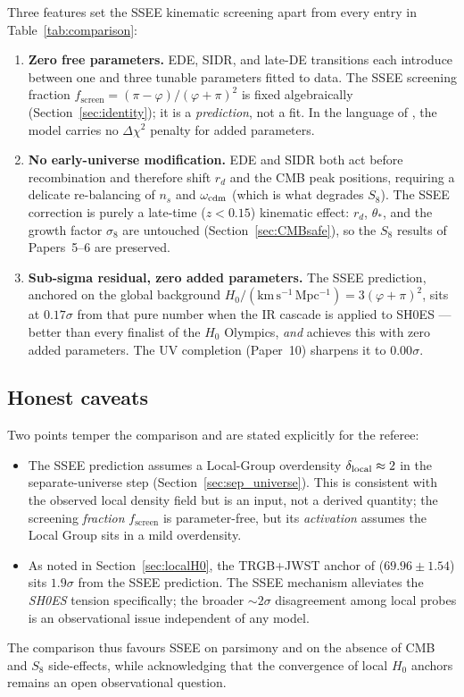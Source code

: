 \documentclass[12pt,a4paper]{article}
\newcommand{\phiG}{\varphi}
\newcommand{\fsc}{f_{\mathrm{screen}}}
\begin{document}
Three features set the SSEE kinematic screening apart from every entry in
Table~\ref{tab:comparison}:
\begin{enumerate}[label=(\roman*),itemsep=2pt]
  \item \textbf{Zero free parameters.}  EDE, SIDR, and late-DE transitions each
        introduce between one and three tunable parameters fitted to data.
        The SSEE screening fraction $\fsc = (\pi-\phiG)/(\phiG+\pi)^2$ is fixed
        algebraically (Section~\ref{sec:identity}); it is a \emph{prediction},
        not a fit.  In the language of \citet{Schoneberg2022}, the model carries
        no $\Delta\chi^2$ penalty for added parameters.
  \item \textbf{No early-universe modification.}  EDE and SIDR both act before
        recombination and therefore shift $r_d$ and the CMB peak positions,
        requiring a delicate re-balancing of $n_s$ and $\omega_{\rm cdm}$
        (which is what degrades $S_8$).  The SSEE correction is purely a
        late-time ($z<0.15$) kinematic effect: $r_d$, $\theta_*$, and the
        growth factor $\sigma_8$ are untouched (Section~\ref{sec:CMBsafe}),
        so the $S_8$ results of Papers~5--6 are preserved.
  \item \textbf{Sub-sigma residual, zero added parameters.}  The
        SSEE prediction, anchored on the global background
        $H_0/(\mathrm{km\,s^{-1}\,Mpc^{-1}})=3(\phiG+\pi)^2$, sits at $0.17\sigma$
        from that pure number when the IR cascade is applied to SH0ES --- better than every finalist of the
        $H_0$ Olympics, \emph{and} achieves this with zero added parameters.
        The UV completion (Paper~10) sharpens it to $0.00\sigma$.
\end{enumerate}

\subsection{Honest caveats}
\label{sec:comp_caveats}

Two points temper the comparison and are stated explicitly for the referee:
\begin{itemize}[itemsep=2pt]
  \item The SSEE prediction assumes a Local-Group overdensity
        $\delta_{\rm local}\approx 2$ in the separate-universe step
        (Section~\ref{sec:sep_universe}).  This is consistent with the observed
        local density field but is an input, not a derived quantity; the
        screening \emph{fraction} $\fsc$ is parameter-free, but its
        \emph{activation} assumes the Local Group sits in a mild overdensity.
  \item As noted in Section~\ref{sec:localH0}, the TRGB+JWST anchor of
        \citet{Freedman2024} ($69.96\pm1.54$) sits $1.9\sigma$ from the SSEE
        prediction.  The SSEE mechanism alleviates the \emph{SH0ES} tension
        specifically; the broader $\sim 2\sigma$ disagreement among local
        probes is an observational issue independent of any model.
\end{itemize}
The comparison thus favours SSEE on parsimony and on the absence of CMB and
$S_8$ side-effects, while acknowledging that the convergence of local $H_0$
anchors remains an open observational question.
\end{document}
